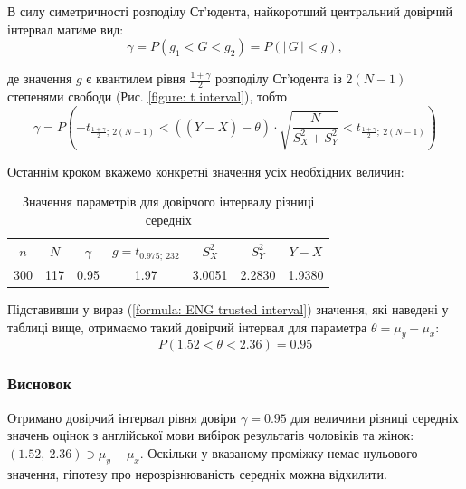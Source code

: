 В силу симетричності розподілу Ст'юдента, найкоротший центральний довірчий інтервал матиме вид:
\begin{equation*}
    \gamma = P(g_1<G<g_2)=P(|\, G\, |<g),
\end{equation*}

де значення $g$ є квантилем рівня $\frac{1+\gamma}{2}$ розподілу Ст'юдента із $2(N-1)$ степенями свободи 
(Рис. \ref{figure: t interval}), тобто
\begin{equation}
    \gamma = P\left(
        -t_{\tfrac{1+\gamma}{2};\ 2(N-1)} < 
        \left((\overline{Y}-\overline{X})-\theta\right)\cdot \sqrt{\frac{N}{S_X^2+S_Y^2}} < 
        t_{\tfrac{1+\gamma}{2};\ 2(N-1)}
    \right) \label{formula: ENG trusted interval}
\end{equation}

Останнім кроком вкажемо конкретні значення усіх необхідних величин:

\vspace{0.8cm}
\begin{table}[H]
    \begin{center}
        \begin{tabular}{||c|c|c|c|c|c|c||}
            \hline
            $n$ & $N$ & $\gamma$ & $g=t_{0.975;\ 232}$ & $S_X^2$ & $S_Y^2$ & $\overline{Y}-\overline{X}$ \\
            \hline \hline
            300 & 117 & 0.95 & 1.97 & 3.0051 & 2.2830 & 1.9380 \\
            \hline
        \end{tabular}
        \caption{Значення параметрів для довірчого інтервалу різниці середніх}
        \label{table: ENG t interval}
    \end{center}
\end{table}

Підставивши у вираз (\ref{formula: ENG trusted interval}) значення, які наведені у таблиці вище, отримаємо такий довірчий 
інтервал для параметра $\theta=\mu_y-\mu_x$:
\begin{equation}
    P(1.52 < \theta < 2.36)=0.95 \label{formula: calculated ENG trusted interval}
\end{equation}

\subsubsection{Висновок}

Отримано довірчий інтервал рівня довіри $\gamma=0.95$ для величини різниці середніх значень 
оцінок з англійської мови вибірок результатів чоловіків та жінок: $(1.52,\ 2.36)\ni \mu_y-\mu_x$. Оскільки 
у вказаному проміжку немає нульового значення, гіпотезу про нерозрізнюваність середніх можна відхилити. 

